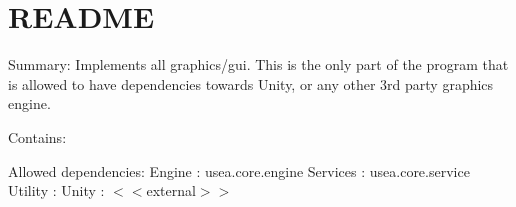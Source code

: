 \chapter{README}
\hypertarget{md__c_1_2_users_2armem_2_one_drive_2_dokumente_2_projects_2_untitled_survival_exploration_2_assecf4362375b64e37f2124d37a7b60371c}{}\label{md__c_1_2_users_2armem_2_one_drive_2_dokumente_2_projects_2_untitled_survival_exploration_2_assecf4362375b64e37f2124d37a7b60371c}
Summary\+: Implements all graphics/gui. This is the only part of the program that is allowed to have dependencies towards Unity, or any other 3rd party graphics engine.

Contains\+: 

Allowed dependencies\+: Engine \+: usea.\+core.\+engine Services \+: usea.\+core.\+service Utility \+:  Unity \+: \texorpdfstring{$<$}{<}$<$external$>$\texorpdfstring{$>$}{>} 